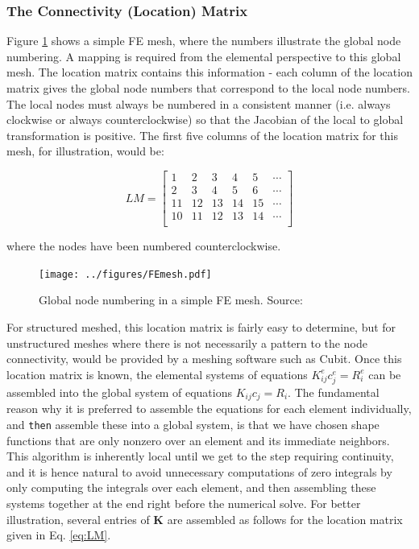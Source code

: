\documentclass[10pt]{article}
\newcommand{\beq}{\begin{equation}}
\newcommand{\eeq}{\end{equation}}
\begin{document}
\subsubsection{The Connectivity (Location) Matrix}
Figure \ref{fig:FEmesh} shows a simple FE mesh, where the numbers illustrate the global node numbering. A mapping is required from the elemental perspective to this global mesh. The location matrix contains this information - each column of the location matrix gives the global node numbers that correspond to the local node numbers. The local nodes must always be numbered in a consistent manner (i.e. always clockwise or always counterclockwise) so that the Jacobian of the local to global transformation is positive. The first five columns of the location matrix for this mesh, for illustration, would be:

\beq
\label{eq:LM}
LM=\begin{bmatrix}
1 & 2 & 3 & 4 & 5 & \cdots\\
2 & 3 & 4 & 5 & 6 & \cdots\\
11 & 12 & 13 & 14 & 15 & \cdots\\
10 & 11 & 12 & 13 & 14 & \cdots\\
\end{bmatrix}
\eeq

where the nodes have been numbered counterclockwise.

\begin{figure}[H]
\centering
\texttt{[image: ../figures/FEmesh.pdf]}
\caption{Global node numbering in a simple FE mesh. Source:}
\label{fig:FEmesh}
\end{figure}

For structured meshed, this location matrix is fairly easy to determine, but for unstructured meshes where there is not necessarily a pattern to the node connectivity, would be provided by a meshing software such as Cubit.  Once this location matrix is known, the elemental systems of equations \(K_{ij}^ec_j^e=R_i^e\) can be assembled into the global system of equations \(K_{ij}c_j=R_i\). The fundamental reason why it is preferred to assemble the equations for each element individually, and {\tt then} assemble these into a global system, is that we have chosen shape functions that are only nonzero over an element and its immediate neighbors. This algorithm is inherently local until we get to the step requiring continuity, and it is hence natural to avoid unnecessary computations of zero integrals by only computing the integrals over each element, and then assembling these systems together at the end right before the numerical solve. For better illustration, several entries of \textbf{K} are assembled as follows for the location matrix given in Eq. \eqref{eq:LM}.
\end{document}
